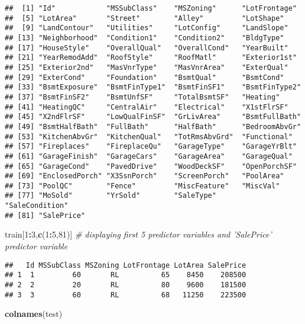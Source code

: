 \documentclass[]{article}
\newenvironment{Shaded}{\begin{snugshade}}{\end{snugshade}}
\newcommand{\KeywordTok}[1]{\textcolor[rgb]{0.13,0.29,0.53}{\textbf{#1}}}
\newcommand{\DecValTok}[1]{\textcolor[rgb]{0.00,0.00,0.81}{#1}}
\newcommand{\CommentTok}[1]{\textcolor[rgb]{0.56,0.35,0.01}{\textit{#1}}}
\newcommand{\OperatorTok}[1]{\textcolor[rgb]{0.81,0.36,0.00}{\textbf{#1}}}
\newcommand{\NormalTok}[1]{#1}
\begin{document}
\begin{verbatim}
##  [1] "Id"            "MSSubClass"    "MSZoning"      "LotFrontage"  
##  [5] "LotArea"       "Street"        "Alley"         "LotShape"     
##  [9] "LandContour"   "Utilities"     "LotConfig"     "LandSlope"    
## [13] "Neighborhood"  "Condition1"    "Condition2"    "BldgType"     
## [17] "HouseStyle"    "OverallQual"   "OverallCond"   "YearBuilt"    
## [21] "YearRemodAdd"  "RoofStyle"     "RoofMatl"      "Exterior1st"  
## [25] "Exterior2nd"   "MasVnrType"    "MasVnrArea"    "ExterQual"    
## [29] "ExterCond"     "Foundation"    "BsmtQual"      "BsmtCond"     
## [33] "BsmtExposure"  "BsmtFinType1"  "BsmtFinSF1"    "BsmtFinType2" 
## [37] "BsmtFinSF2"    "BsmtUnfSF"     "TotalBsmtSF"   "Heating"      
## [41] "HeatingQC"     "CentralAir"    "Electrical"    "X1stFlrSF"    
## [45] "X2ndFlrSF"     "LowQualFinSF"  "GrLivArea"     "BsmtFullBath" 
## [49] "BsmtHalfBath"  "FullBath"      "HalfBath"      "BedroomAbvGr" 
## [53] "KitchenAbvGr"  "KitchenQual"   "TotRmsAbvGrd"  "Functional"   
## [57] "Fireplaces"    "FireplaceQu"   "GarageType"    "GarageYrBlt"  
## [61] "GarageFinish"  "GarageCars"    "GarageArea"    "GarageQual"   
## [65] "GarageCond"    "PavedDrive"    "WoodDeckSF"    "OpenPorchSF"  
## [69] "EnclosedPorch" "X3SsnPorch"    "ScreenPorch"   "PoolArea"     
## [73] "PoolQC"        "Fence"         "MiscFeature"   "MiscVal"      
## [77] "MoSold"        "YrSold"        "SaleType"      "SaleCondition"
## [81] "SalePrice"
\end{verbatim}

\begin{Shaded}
\begin{Highlighting}[]
\NormalTok{train[}\DecValTok{1}\OperatorTok{:}\DecValTok{3}\NormalTok{,}\KeywordTok{c}\NormalTok{(}\DecValTok{1}\OperatorTok{:}\DecValTok{5}\NormalTok{,}\DecValTok{81}\NormalTok{)]  }\CommentTok{# displaying first 5 predictor variables and 'SalePrice' predictor variable}
\end{Highlighting}
\end{Shaded}

\begin{verbatim}
##   Id MSSubClass MSZoning LotFrontage LotArea SalePrice
## 1  1         60       RL          65    8450    208500
## 2  2         20       RL          80    9600    181500
## 3  3         60       RL          68   11250    223500
\end{verbatim}

\begin{Shaded}
\begin{Highlighting}[]
\KeywordTok{colnames}\NormalTok{(test)}
\end{Highlighting}
\end{Shaded}
\end{document}
